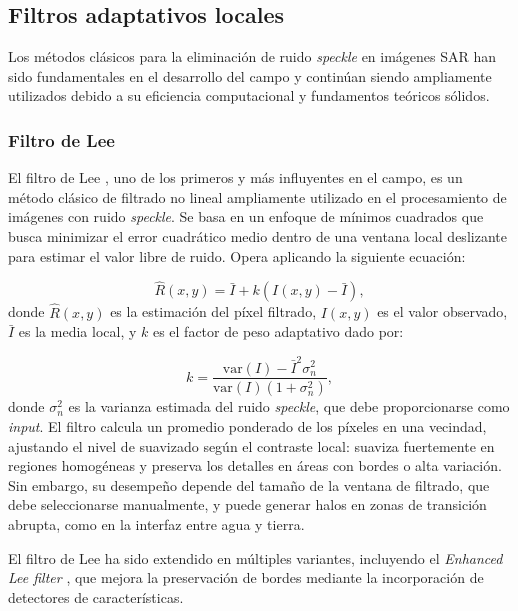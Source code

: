 \subsection{Filtros adaptativos locales}

Los métodos clásicos para la eliminación de ruido \emph{speckle} en imágenes SAR han sido fundamentales en el desarrollo del campo y continúan siendo ampliamente utilizados debido a su eficiencia computacional y fundamentos teóricos sólidos.

\subsubsection{Filtro de Lee}\label{sec:descripcion_filtro_lee}

El filtro de Lee \cite{lee1980digital}, uno de los primeros y más influyentes en el campo, es un método clásico de filtrado no lineal ampliamente utilizado en el procesamiento de imágenes con ruido \emph{speckle}. Se basa en un enfoque de mínimos cuadrados que busca minimizar el error cuadrático medio dentro de una ventana local deslizante para estimar el valor libre de ruido. Opera aplicando la siguiente ecuación:

\begin{equation}
	\hat{R}(x,y) = \bar{I} + k(I(x,y) - \bar{I}),
\end{equation}
donde $\hat{R}(x,y)$ es la estimación del píxel filtrado, $I(x,y)$ es el valor observado, $\bar{I}$ es la media local, y $k$ es el factor de peso adaptativo dado por:

\begin{equation}
	k = \frac{\text{var}(I) - \bar{I}^2\sigma_n^2}{\text{var}(I)(1 + \sigma_n^2)},
\end{equation}
donde $\sigma_n^2$ es la varianza estimada del ruido \emph{speckle}, que debe proporcionarse como \emph{input}. El filtro calcula un promedio ponderado de los píxeles en una vecindad, ajustando el nivel de suavizado según el contraste local: suaviza fuertemente en regiones homogéneas y preserva los detalles en áreas con bordes o alta variación. Sin embargo, su desempeño depende del tamaño de la ventana de filtrado, que debe seleccionarse manualmente, y puede generar halos en zonas de transición abrupta, como en la interfaz entre agua y tierra.

El filtro de Lee ha sido extendido en múltiples variantes, incluyendo el \emph{Enhanced Lee filter} \cite{lopes1990structure}, que mejora la preservación de bordes mediante la incorporación de detectores de características.

